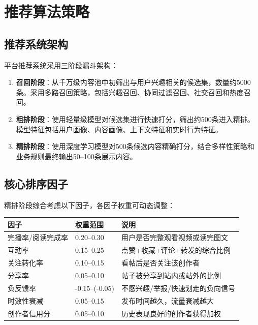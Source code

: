\documentclass[a4paper,12pt]{article}
\begin{document}
\section{推荐算法策略}

\subsection{推荐系统架构}

平台推荐系统采用三阶段漏斗架构：

\begin{enumerate}[noitemsep]
  \item \textbf{召回阶段}：从千万级内容池中初筛出与用户兴趣相关的候选集，数量约5000条。采用多路召回策略，包括兴趣召回、协同过滤召回、社交召回和热度召回。
  \item \textbf{粗排阶段}：使用轻量级模型对候选集进行快速打分，筛出约500条进入精排。模型特征包括用户画像、内容画像、上下文特征和实时行为特征。
  \item \textbf{精排阶段}：使用深度学习模型对500条候选内容精确打分，结合多样性策略和业务规则最终输出50--100条展示内容。
\end{enumerate}

\subsection{核心排序因子}

精排阶段综合考虑以下因子，各因子权重可动态调整：

\begin{table}[h]
\centering
\begin{tabular}{lll}
\toprule
\textbf{因子} & \textbf{权重范围} & \textbf{说明} \\
\midrule
完播率/阅读完成率 & 0.20--0.30 & 用户是否完整观看视频或读完图文 \\
互动率 & 0.15--0.25 & 点赞+收藏+评论+转发的综合比例 \\
关注转化率 & 0.10--0.15 & 看帖后是否关注该创作者 \\
分享率 & 0.05--0.10 & 帖子被分享到站内或站外的比例 \\
负反馈率 & -0.15--(-0.05) & 不感兴趣/举报/快速划走的负向信号 \\
时效性衰减 & 0.05--0.15 & 发布时间越久，流量衰减越大 \\
创作者信用分 & 0.05--0.10 & 历史表现良好的创作者获得加权 \\
\bottomrule
\end{tabular}
\end{table}
\end{document}

